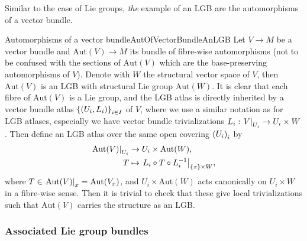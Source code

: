 \documentclass[reqno,a4paper,oneside]{amsart}
\theoremstyle{plain}
\theoremstyle{remark}
\theoremstyle{definition}
\begin{document}
Similar to the case of Lie groups, \textit{the} example of an LGB are the automorphisms of a vector bundle.

\begin{examples}{Automorphisms of a vector bundle}{AutOfVectorBundleAnLGB}
Let $V\to M$ be a vector bundle and $\mathrm{Aut}(V) \to M$ its bundle of fibre-wise automorphisms (not to be confused with the sections of $\mathrm{Aut}(V)$ which are the base-preserving automorphisms of $V$). Denote with $W$ the structural vector space of $V$, then $\mathrm{Aut}(V)$ is an LGB with structural Lie group $\mathrm{Aut}(W)$. It is clear that each fibre of $\mathrm{Aut}(V)$ is a Lie group, and the LGB atlas is directly inherited by a vector bundle atlas $\mleft\{ \mleft( U_i, L_i \mright) \mright\}_{i \in I}$ of $V$, where we use a similar notation as for LGB atlases, especially we have vector bundle trivializations $L_{i}: \mleft.V\mright|_{U_i} \to U_i \times W$. Then define an LGB atlas over the same open covering $\mleft( U_i \mright)_i$ by
\begin{align*}
\mleft. \mathrm{Aut}(V) \mright|_{U_i} &\to U_i \times \mathrm{Aut}(W),\\
T &\mapsto \mleft.L_{i} \circ T \circ L_{i}^{-1}\mright|_{\{x\} \times W},
\end{align*}
where $T \in \mleft.\mathrm{Aut}(V)\mright|_x = \mathrm{Aut}(V_x)$,
and $U_i \times \mathrm{Aut}(W)$ acts canonically on $U_i \times W$ in a fibre-wise sense. Then it is trivial to check that these give local trivializations such that $\mathrm{Aut}(V)$ carries the structure as an LGB.
\end{examples}

\subsubsection{Associated Lie group bundles}\label{AssocLGBsSubSection}
\end{document}
